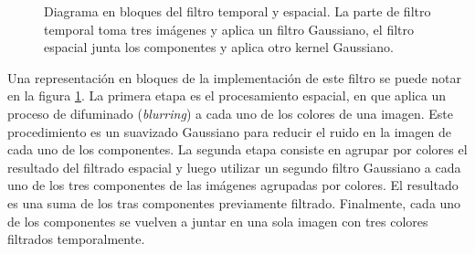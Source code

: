 \begin{figure}[h!]
\centering
\caption[Filtro temporal spacial]{Diagrama en bloques del filtro temporal y espacial. La parte de filtro temporal toma tres imágenes y aplica un filtro Gaussiano, el filtro espacial junta los componentes y aplica otro kernel Gaussiano.}
\label{fig:spatio_temporal_filter}
\end{figure}


Una representación en bloques de la implementación de este filtro se puede notar en la figura \ref{fig:spatio_temporal_filter}. La primera etapa es el procesamiento espacial, en que aplica un proceso de difuminado (\textit{blurring}) a cada uno de los colores de una imagen. Este procedimiento es un suavizado Gaussiano para reducir el ruido en la imagen de cada uno de los componentes. La segunda etapa consiste en agrupar por colores el resultado del filtrado espacial y luego utilizar un segundo filtro Gaussiano a cada uno de los tres componentes de las imágenes agrupadas por colores. El resultado es una suma de los tras componentes previamente filtrado. Finalmente, cada uno de los componentes se vuelven a juntar en una sola imagen con tres colores filtrados temporalmente.

